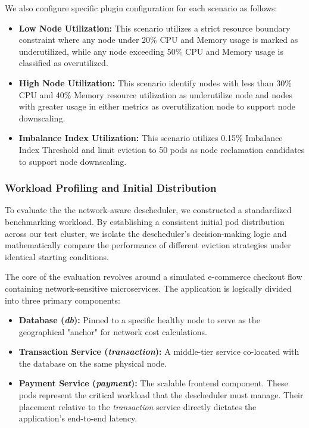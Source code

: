 We also configure specific plugin configuration for each scenario as follows:

\begin{itemize}
    \item \textbf{Low Node Utilization:} This scenario utilizes a strict resource boundary constraint where any node under 20\% CPU and Memory usage is marked as underutilized, while any node exceeding 50\% CPU and Memory usage is classified as overutilized.

    \item \textbf{High Node Utilization:} This scenario identify nodes with less than 30\% CPU and 40\% Memory resource utilization as underutilize node and nodes with greater usage in either metrics as overutilization node to support node downscaling.

    \item \textbf{Imbalance Index Utilization:} This scenario utilizes 0.15\% Imbalance Index Threshold and limit eviction to 50 pods as node reclamation candidates to support node downscaling.
\end{itemize}

\subsubsection{Workload Profiling and Initial Distribution}
\label{subsec:netaware4_workloadprofiling}

To evaluate the the network-aware descheduler, we constructed a standardized benchmarking workload. By establishing a consistent initial pod distribution across our test cluster, we isolate the descheduler's decision-making logic and mathematically compare the performance of different eviction strategies under identical starting conditions.

The core of the evaluation revolves around a simulated e-commerce checkout flow containing network-sensitive microservices. The application is logically divided into three primary components:

\begin{itemize}
    \item \textbf{Database (\textit{db}):} Pinned to a specific healthy node to serve as the geographical "anchor" for network cost calculations.
    \item \textbf{Transaction Service (\textit{transaction}):} A middle-tier service co-located with the database on the same physical node.
    \item \textbf{Payment Service (\textit{payment}):} The scalable frontend component. These pods represent the critical workload that the descheduler must manage. Their placement relative to the \textit{transaction} service directly dictates the application's end-to-end latency.
\end{itemize}

